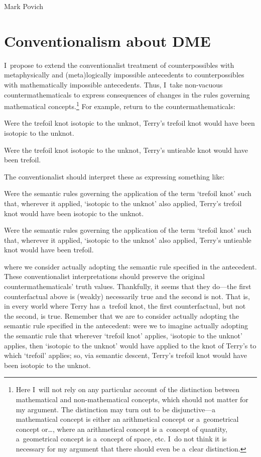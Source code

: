 \begin{artengenv}{Mark Povich}
\section{Conventionalism about DME}
I~propose to extend the conventionalist treatment of counterpossibles with metaphysically and (meta)logically impossible antecedents to counterpossibles with mathematically impossible antecedents. Thus, I~take non-vacuous countermathematicals to express consequences of changes in the rules governing mathematical concepts.\footnote{Here I~will not rely on any particular account of the distinction between mathematical and non-mathematical concepts, which should not matter for my argument. The distinction may turn out to be disjunctive---a mathematical concept is either an arithmetical concept or a~geometrical concept or…, where an arithmetical concept is a~concept of quantity, a~geometrical concept is a~concept of space, etc. I~do not think it is necessary for my argument that there should even be a~clear distinction. } For example, return to the countermathematicals:

Were the trefoil knot isotopic to the unknot, Terry's trefoil knot would have been isotopic to the unknot.

Were the trefoil knot isotopic to the unknot, Terry's untieable knot would have been trefoil.

The conventionalist should interpret these as expressing something like:

Were the semantic rules governing the application of the term ‘trefoil knot' such that, wherever it applied, ‘isotopic to the unknot' also applied, Terry's trefoil knot would have been isotopic to the unknot.

Were the semantic rules governing the application of the term ‘trefoil knot' such that, wherever it applied, ‘isotopic to the unknot' also applied, Terry's untieable knot would have been trefoil.

where we consider actually adopting the semantic rule specified in the antecedent. These conventionalist interpretations should preserve the original countermathematicals' truth values. Thankfully, it seems that they do---the first counterfactual above is (weakly) necessarily true and the second is not. That is, in every world where Terry has a~trefoil knot, the first counterfactual, but not the second, is true. Remember that we are to consider actually adopting the semantic rule specified in the antecedent: were we to imagine actually adopting the semantic rule that wherever ‘trefoil knot' applies, ‘isotopic to the unknot' applies, then ‘isotopic to the unknot' would have applied to the knot of Terry's to which ‘trefoil' applies; so, via semantic descent, Terry's trefoil knot would have been isotopic to the unknot.


\end{artengenv}
